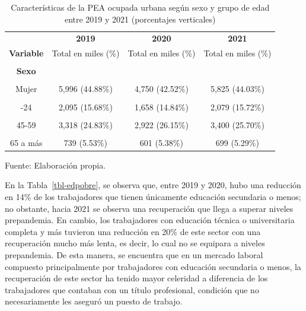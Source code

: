 \documentclass[
  letterpaper,
  12pt,
  oneside,
  spanish,
  doublespacing,
  headsepline,
  parskip]{MastersDoctoralThesis}
\begin{document}
\hypertarget{tbl-peasexeda}{}
\begin{table}[H]
\caption{\label{tbl-peasexeda}Características de la PEA ocupada urbana según sexo y grupo de edad
entre 2019 y 2021 (porcentajes verticales) }\tabularnewline

\centering\begingroup\fontsize{10}{12}\selectfont

\begin{tabular}{cccc}
\toprule
\multicolumn{1}{c}{ } & \multicolumn{1}{c}{\textbf{2019}} & \multicolumn{1}{c}{\textbf{2020}} & \multicolumn{1}{c}{\textbf{2021}} \\
\cmidrule(l{3pt}r{3pt}){2-2} \cmidrule(l{3pt}r{3pt}){3-3} \cmidrule(l{3pt}r{3pt}){4-4}
\textbf{Variable} & Total en miles (\%) & Total en miles (\%) & Total en miles (\%)\\
\midrule
\cellcolor{gray!6}{\textbf{Nacional}} & \cellcolor{gray!6}{13,360 (100.00\%)} & \cellcolor{gray!6}{11,172 (100.00\%)} & \cellcolor{gray!6}{13,229 (100.00\%)}\\
\textbf{Sexo} &  &  & \\
\cellcolor{gray!6}{Hombre} & \cellcolor{gray!6}{7,364 (55.12\%)} & \cellcolor{gray!6}{6,421 (57.48\%)} & \cellcolor{gray!6}{7,405 (55.97\%)}\\
Mujer & 5,996 (44.88\%) & 4,750 (42.52\%) & 5,825 (44.03\%)\\
\cellcolor{gray!6}{\textbf{Grupos de edad}} & \cellcolor{gray!6}{} & \cellcolor{gray!6}{} & \cellcolor{gray!6}{}\\
\addlinespace
14-24 & 2,095 (15.68\%) & 1,658 (14.84\%) & 2,079 (15.72\%)\\
\cellcolor{gray!6}{25-44} & \cellcolor{gray!6}{6,442 (48.21\%)} & \cellcolor{gray!6}{5,445 (48.74\%)} & \cellcolor{gray!6}{6,421 (48.53\%)}\\
45-59 & 3,318 (24.83\%) & 2,922 (26.15\%) & 3,400 (25.70\%)\\
\cellcolor{gray!6}{60-64} & \cellcolor{gray!6}{767 (5.74\%)} & \cellcolor{gray!6}{546 (4.89\%)} & \cellcolor{gray!6}{630 (4.76\%)}\\
65 a más & 739 (5.53\%) & 601 (5.38\%) & 699 (5.29\%)\\
\bottomrule
\end{tabular}
\endgroup{}
\end{table}

\noindent \small Fuente: Elaboración propia. \normalsize

En la Tabla~\ref{tbl-edpobre}, se observa que, entre 2019 y 2020, hubo
una reducción en 14\% de los trabajadores que tienen únicamente
educación secundaria o menos; no obstante, hacia 2021 se observa una
recuperación que llega a superar niveles prepandemia. En cambio, los
trabajadores con educación técnica o universitaria completa y más
tuvieron una reducción en 20\% de este sector con una recuperación mucho
más lenta, es decir, lo cual no se equipara a niveles prepandemia. De
esta manera, se encuentra que en un mercado laboral compuesto
principalmente por trabajadores con educación secundaria o menos, la
recuperación de este sector ha tenido mayor celeridad a diferencia de
los trabajadores que contaban con un título profesional, condición que
no necesariamente les aseguró un puesto de trabajo.
\end{document}
